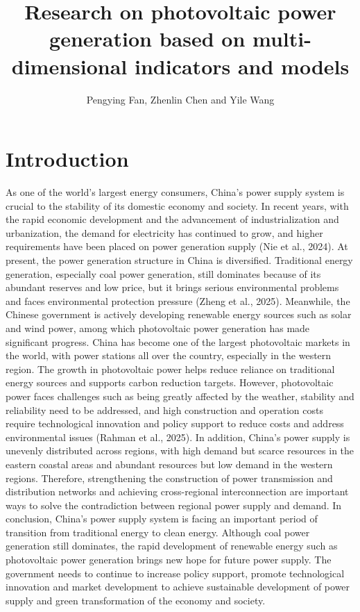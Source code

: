 \documentclass{article}
\title{Research on photovoltaic power generation based on multi-dimensional indicators and models}
\author{Pengying Fan, Zhenlin Chen and Yile Wang}
\date{}
\begin{document}
	\maketitle
	
	\section{Introduction}
	As one of the world's largest energy consumers, China's power supply system is crucial to the stability of its domestic economy and society. In recent years, with the rapid economic development and the advancement of industrialization and urbanization, the demand for electricity has continued to grow, and higher requirements have been placed on power generation supply (Nie et al., 2024). At present, the power generation structure in China is diversified. Traditional energy generation, especially coal power generation, still dominates because of its abundant reserves and low price, but it brings serious environmental problems and faces environmental protection pressure (Zheng et al., 2025). Meanwhile, the Chinese government is actively developing renewable energy sources such as solar and wind power, among which photovoltaic power generation has made significant progress. China has become one of the largest photovoltaic markets in the world, with power stations all over the country, especially in the western region. The growth in photovoltaic power helps reduce reliance on traditional energy sources and supports carbon reduction targets. However, photovoltaic power faces challenges such as being greatly affected by the weather, stability and reliability need to be addressed, and high construction and operation costs require technological innovation and policy support to reduce costs and address environmental issues (Rahman et al., 2025). In addition, China's power supply is unevenly distributed across regions, with high demand but scarce resources in the eastern coastal areas and abundant resources but low demand in the western regions. Therefore, strengthening the construction of power transmission and distribution networks and achieving cross-regional interconnection are important ways to solve the contradiction between regional power supply and demand. In conclusion, China's power supply system is facing an important period of transition from traditional energy to clean energy. Although coal power generation still dominates, the rapid development of renewable energy such as photovoltaic power generation brings new hope for future power supply. The government needs to continue to increase policy support, promote technological innovation and market development to achieve sustainable development of power supply and green transformation of the economy and society.
	
\end{document}
